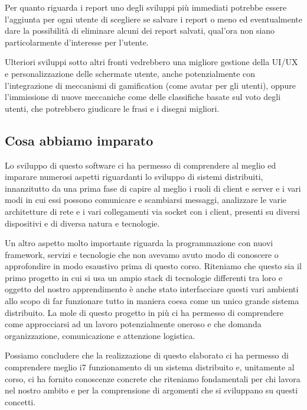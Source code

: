 \noindent Per quanto riguarda i report uno degli sviluppi più immediati potrebbe essere l'aggiunta per ogni utente di scegliere se salvare i report o meno ed eventualmente dare la possibilità di eliminare alcuni dei report salvati, qual'ora non siano particolarmente d'interesse per l'utente. \newline

\noindent Ulteriori sviluppi sotto altri fronti vedrebbero una migliore gestione della UI/UX e personalizzazione delle schermate utente, anche potenzialmente con l'integrazione di meccanismi di gamification (come avatar per gli utenti), oppure l'immissione di nuove meccaniche come delle classifiche basate sul voto degli utenti, che potrebbero giudicare le frasi e i disegni migliori.

\subsection{Cosa abbiamo imparato}
Lo sviluppo di questo software ci ha permesso di comprendere al meglio ed imparare numerosi aspetti riguardanti lo sviluppo di sistemi distribuiti, innanzitutto da una prima fase di capire al meglio i ruoli di client e server e i vari modi in cui essi possono comunicare e scambiarsi messaggi, analizzare le varie architetture di rete e i vari collegamenti via socket con i client, presenti su diversi dispositivi e di diversa natura e tecnologie. \newline

\noindent Un altro aspetto molto importante riguarda la programmazione con nuovi framework, servizi e tecnologie che non avevamo avuto modo di conoscere o approfondire in modo esaustivo prima di questo corso. Riteniamo che questo sia il primo progetto in cui si usa un ampio stack di tecnologie differenti tra loro e oggetto del nostro apprendimento è anche stato interfacciare questi vari ambienti allo scopo di far funzionare tutto in maniera coesa come un unico grande sistema distribuito. La mole di questo progetto in più ci ha permesso di comprendere come approcciarsi ad un lavoro potenzialmente oneroso e che domanda organizzazione, comunicazione e attenzione logistica. \newline

\noindent Possiamo concludere che la realizzazione di questo elaborato ci ha permesso di comprendere meglio i7 funzionamento di un sistema distribuito e, unitamente al corso, ci ha fornito conoscenze concrete che riteniamo fondamentali per chi lavora nel nostro ambito e per la comprensione di argomenti che si sviluppano su questi concetti.

\newpage
